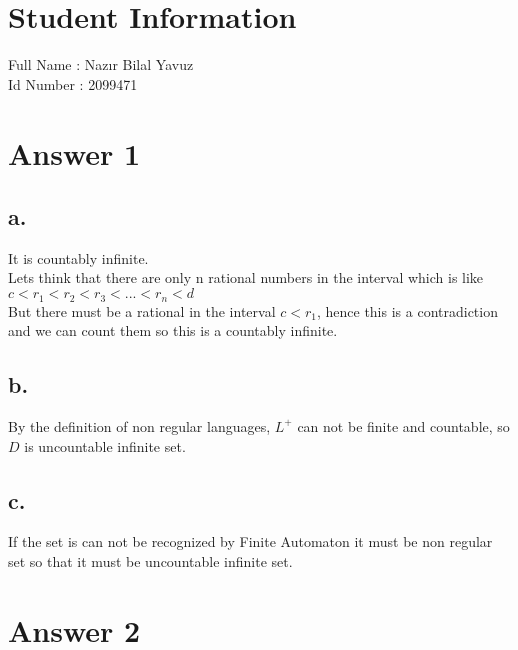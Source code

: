 \documentclass[12pt]{article}
\begin{document}
\section*{Student Information } 
Full Name : Nazır Bilal Yavuz \\
Id Number :  2099471\\

\section*{Answer 1}

\subsection*{a.}
It is countably infinite.\\ Lets think that there are only n rational numbers in the interval which is like\\
 \(c < r_1 < r_2  < r_3  < ... < r_n < d \)\\
 But there must be a rational in the interval \( c < r_1\), hence this is a contradiction and we can count them so this is a countably infinite.\\

\subsection*{b.}
By the definition of non regular languages, \( L^+ \) can not be finite and countable, so \(D \) is uncountable infinite set.\\

\subsection*{c.}
If the set is can not be recognized by Finite Automaton it must be non regular set so that it must be uncountable infinite set.
\\

\section*{Answer 2}
\end{document}
